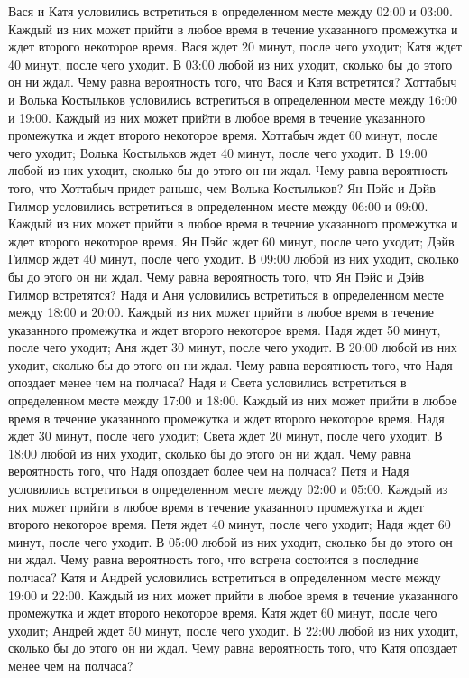 Вася и Катя условились встретиться в определенном месте между 02:00 и 03:00. Каждый из них может прийти в любое время в течение указанного промежутка и ждет второго некоторое время. Вася ждет 20 минут, после чего уходит; Катя ждет 40 минут, после чего уходит. В 03:00 любой из них уходит, сколько бы до этого он ни ждал. Чему равна вероятность того, что Вася и Катя встретятся?
Хоттабыч и Волька Костыльков условились встретиться в определенном месте между 16:00 и 19:00. Каждый из них может прийти в любое время в течение указанного промежутка и ждет второго некоторое время. Хоттабыч ждет 60 минут, после чего уходит; Волька Костыльков ждет 40 минут, после чего уходит. В 19:00 любой из них уходит, сколько бы до этого он ни ждал. Чему равна вероятность того, что Хоттабыч придет раньше, чем Волька Костыльков?
Ян Пэйс и Дэйв Гилмор условились встретиться в определенном месте между 06:00 и 09:00. Каждый из них может прийти в любое время в течение указанного промежутка и ждет второго некоторое время. Ян Пэйс ждет 60 минут, после чего уходит; Дэйв Гилмор ждет 40 минут, после чего уходит. В 09:00 любой из них уходит, сколько бы до этого он ни ждал. Чему равна вероятность того, что Ян Пэйс и Дэйв Гилмор встретятся?
Надя и Аня условились встретиться в определенном месте между 18:00 и 20:00. Каждый из них может прийти в любое время в течение указанного промежутка и ждет второго некоторое время. Надя ждет 50 минут, после чего уходит; Аня ждет 30 минут, после чего уходит. В 20:00 любой из них уходит, сколько бы до этого он ни ждал. Чему равна вероятность того, что Надя опоздает менее чем на полчаса?
Надя и Света условились встретиться в определенном месте между 17:00 и 18:00. Каждый из них может прийти в любое время в течение указанного промежутка и ждет второго некоторое время. Надя ждет 30 минут, после чего уходит; Света ждет 20 минут, после чего уходит. В 18:00 любой из них уходит, сколько бы до этого он ни ждал. Чему равна вероятность того, что Надя опоздает более чем на полчаса?
Петя и Надя условились встретиться в определенном месте между 02:00 и 05:00. Каждый из них может прийти в любое время в течение указанного промежутка и ждет второго некоторое время. Петя ждет 40 минут, после чего уходит; Надя ждет 60 минут, после чего уходит. В 05:00 любой из них уходит, сколько бы до этого он ни ждал. Чему равна вероятность того, что встреча состоится в последние полчаса?
Катя и Андрей условились встретиться в определенном месте между 19:00 и 22:00. Каждый из них может прийти в любое время в течение указанного промежутка и ждет второго некоторое время. Катя ждет 60 минут, после чего уходит; Андрей ждет 50 минут, после чего уходит. В 22:00 любой из них уходит, сколько бы до этого он ни ждал. Чему равна вероятность того, что Катя опоздает менее чем на полчаса?
